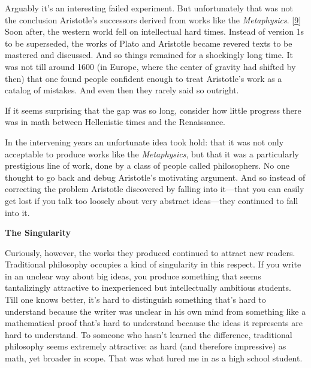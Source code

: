 Arguably it's an interesting failed experiment.
                  But unfortunately that was not the conclusion Aristotle's
                  successors derived from works like the \emph{Metaphysics}.
                  [\href{\#f9n}{9}]
                  Soon after, the western world fell on intellectual hard times.
                  Instead of version 1s to be superseded, the works of Plato and
                  Aristotle became revered texts to be mastered and discussed.
                  And so things remained for a shockingly long time. It was not
                  till around 1600 (in Europe, where the center of gravity had
                  shifted by then) that one found people confident enough to
                  treat Aristotle's work as a catalog of mistakes. And even then
                  they rarely said so outright.

If it seems
                  surprising that the gap was so long, consider how little
                  progress there was in math between Hellenistic times and the
                  Renaissance.

In the intervening years an
                  unfortunate idea took hold: that it was not only acceptable to
                  produce works like the \emph{Metaphysics}, but that it was a
                  particularly prestigious line of work, done by a class of
                  people called philosophers. No one thought to go back and
                  debug Aristotle's motivating argument. And so instead of
                  correcting the problem Aristotle discovered by falling into
                  it---that you can easily get lost if you talk too loosely
                  about very abstract ideas---they continued to fall into
                  it.

\textbf{The Singularity}

Curiously,
                  however, the works they produced continued to attract new
                  readers. Traditional philosophy occupies a kind of singularity
                  in this respect. If you write in an unclear way about big
                  ideas, you produce something that seems tantalizingly
                  attractive to inexperienced but intellectually ambitious
                  students. Till one knows better, it's hard to distinguish
                  something that's hard to understand because the writer was
                  unclear in his own mind from something like a mathematical
                  proof that's hard to understand because the ideas it
                  represents are hard to understand. To someone who hasn't
                  learned the difference, traditional philosophy seems extremely
                  attractive: as hard (and therefore impressive) as math, yet
                  broader in scope. That was what lured me in as a high school
                  student.

